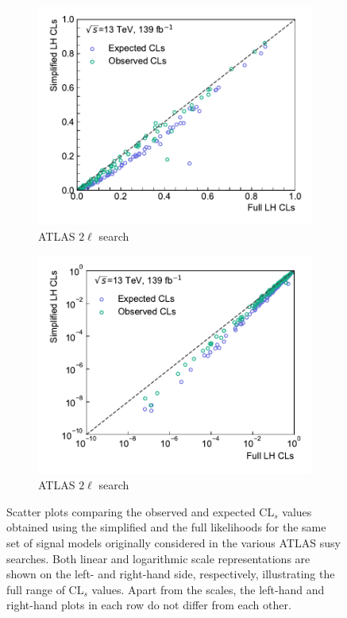 \begin{figure}
\begin{subfigure}[b]{0.5\textwidth}
		\centering\includegraphics[width=\textwidth]{cls_scatter_2L0J_lin}
		\caption{ATLAS $2\ell$ search~\cite{SUSY-2018-32}}
	\end{subfigure}\hfill
	\begin{subfigure}[b]{0.5\textwidth}
		\centering\includegraphics[width=\textwidth]{cls_scatter_2L0J_log}
		\caption{ATLAS $2\ell$ search~\cite{SUSY-2018-32}}
	\end{subfigure}\hfill
	\caption{Scatter plots comparing the observed and expected CL$_s$ values obtained using the simplified and the full likelihoods for the same set of signal models originally considered in the various ATLAS \gls{susy} searches. Both linear and logarithmic scale representations are shown on the left- and right-hand side, respectively, illustrating the full range of CL$_s$ values. Apart from the scales, the left-hand and right-hand plots in each row do not differ from each other.}\label{fig:app_results_cls_1}
\end{figure}


